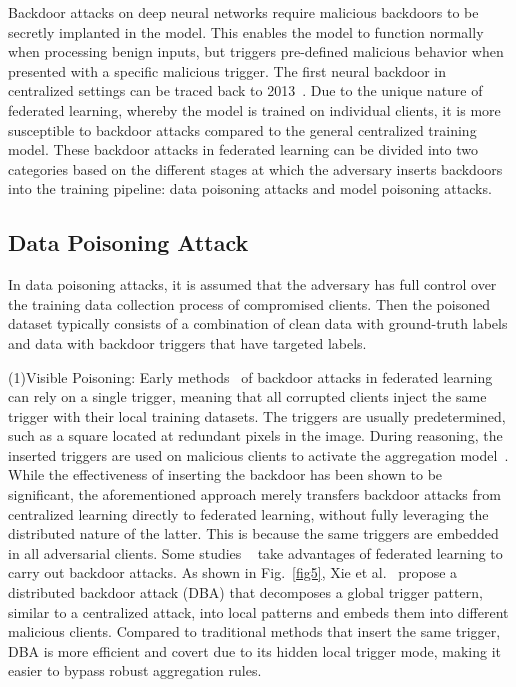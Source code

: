 \begin{table}[t]
\begin{tabular}{|c|c|c|c|c|}
    \toprule
    \end{tabular}
    \end{table} 

Backdoor attacks on deep neural networks require
malicious backdoors to be secretly implanted in the model.
This enables the model to function normally when
processing benign inputs, but triggers pre-defined malicious
behavior when presented with a specific malicious trigger.
The first neural backdoor in centralized settings can be
traced back to 2013~\cite{geigel2013neural,gu2017badnets}.
Due to the unique nature of federated learning,
whereby the model is trained on individual clients, it is
more susceptible to backdoor attacks compared to the
general centralized training model. These backdoor attacks
in federated learning can be divided into two categories
based on the different stages at which the adversary
inserts backdoors into the training pipeline: data poisoning
attacks and model poisoning attacks. 

\subsection{Data Poisoning Attack}  
In data poisoning attacks, it is assumed that the
adversary has full control over the training data collection
process of compromised clients. Then the poisoned dataset
typically consists of a combination of clean data with
ground-truth labels and data with backdoor triggers that
have targeted labels.  

(1)Visible Poisoning: Early methods~\cite{bagdasaryan2020backdoor,gong2022backdoor} of backdoor
attacks in federated learning can rely on a single trigger,
meaning that all corrupted clients inject the same trigger
with their local training datasets. The triggers are usually predetermined, such as a
square located at redundant pixels in the image. During
reasoning, the inserted triggers are used on malicious
clients to activate the aggregation model~\cite{bagdasaryan2020backdoor,gong2022backdoor}. While
the effectiveness of inserting the backdoor has been shown
to be significant, the aforementioned approach merely
transfers backdoor attacks from centralized learning
directly to federated learning, without fully leveraging the
distributed nature of the latter. This is because the same
triggers are embedded in all adversarial clients. Some
studies ~\cite{xie2019dba} take advantages of federated learning to carry out
backdoor attacks. As shown in Fig.~\ref{fig5}, Xie et al.~\cite{xie2019dba} propose
a distributed backdoor attack (DBA) that decomposes a
global trigger pattern, similar to a centralized attack, into
local patterns and embeds them into different malicious
clients. Compared to traditional methods that insert the
same trigger, DBA is more eﬀicient and covert due to
its hidden local trigger mode, making it easier to bypass
robust aggregation rules. 

